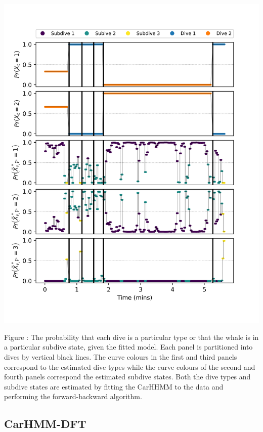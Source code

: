 \documentclass{article}
\begin{document}
        \begin{center}
        \includegraphics[width=6in]{../Plots/2019/20190902-182840-CATs_OB_1_0_267_CarHHMM1_decoded_states.png}
        \end{center}
        
        \noindent Figure : The probability that each dive is a particular type or that the whale is in a particular subdive state, given the fitted model. Each panel is partitioned into dives by vertical black lines. The curve colours in the first and third panels correspond to the estimated dive types while the curve colours of the second and fourth panels correspond the estimated subdive states. Both the dive types and subdive states are estimated by fitting the CarHHMM to the data and performing the forward-backward algorithm.
        \addtocounter{fignum}{1}
        
        \subsection{CarHMM-DFT}
        
\end{document}
